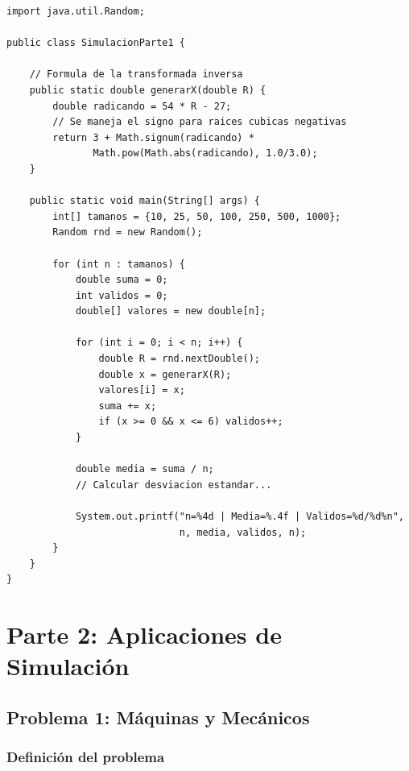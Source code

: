 \documentclass[12pt,a4paper]{article}
\begin{document}
\begin{lstlisting}[caption={Estructura del programa Java para la Parte 1}]
import java.util.Random;

public class SimulacionParte1 {
    
    // Formula de la transformada inversa
    public static double generarX(double R) {
        double radicando = 54 * R - 27;
        // Se maneja el signo para raices cubicas negativas
        return 3 + Math.signum(radicando) * 
               Math.pow(Math.abs(radicando), 1.0/3.0);
    }
    
    public static void main(String[] args) {
        int[] tamanos = {10, 25, 50, 100, 250, 500, 1000};
        Random rnd = new Random();
        
        for (int n : tamanos) {
            double suma = 0;
            int validos = 0;
            double[] valores = new double[n];
            
            for (int i = 0; i < n; i++) {
                double R = rnd.nextDouble();
                double x = generarX(R);
                valores[i] = x;
                suma += x;
                if (x >= 0 && x <= 6) validos++;
            }
            
            double media = suma / n;
            // Calcular desviacion estandar...
            
            System.out.printf("n=%4d | Media=%.4f | Validos=%d/%d%n",
                              n, media, validos, n);
        }
    }
}
\end{lstlisting}

\newpage

\section{Parte 2: Aplicaciones de Simulación}

\subsection{Problema 1: Máquinas y Mecánicos}

\subsubsection{Definición del problema}
\end{document}
